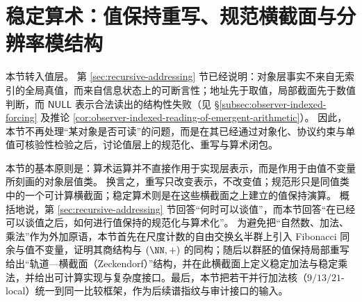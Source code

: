 \section{稳定算术：值保持重写、规范横截面与分辨率模结构}\label{sec:emergent-arithmetic}

本节转入值层。
第 \ref{sec:recursive-addressing} 节已经说明：对象层事实不来自无索引的全局真值，而来自信息状态上的可断言性；地址先于取值，局部截面先于数值判断，而 \(\mathsf{NULL}\) 表示合法读出的结构性失败（见 \S\ref{subsec:observer-indexed-forcing} 及推论 \ref{cor:observer-indexed-reading-of-emergent-arithmetic}）。
因此，本节不再处理“某对象是否可读”的问题，而是在其已经通过对象化、协议约束与单值可核验性检验之后，讨论值层上的规范化、重写与算术闭包。

本节的基本原则是：算术运算并不直接作用于实现层表示，而是作用于由值不变量所刻画的对象层值类。
换言之，重写只改变表示，不改变值；规范形只是同值类中的一个可计算横截面；稳定算术则是在这些横截面之上建立的值保持演算。
概括地说，第 \ref{sec:recursive-addressing} 节回答“何时可以谈值”，而本节回答“在已经可以谈值之后，如何进行值保持的规范化与算术化”。
为避免把“自然数、加法、乘法”作为外加原语，本节首先在尺度计数的自由交换幺半群上引入 Fibonacci 同余与值不变量，证明其商结构与 \((\NN,+)\) 的同构；随后以群胚的值保持局部重写给出“轨道—横截面（Zeckendorf）”结构，并在此横截面上定义稳定加法与稳定乘法，并给出可计算实现与复杂度接口。最后，本节把若干并行加法核（\(9/13/21\)-local）统一到同一比较框架，作为后续谱指纹与审计接口的输入。


















